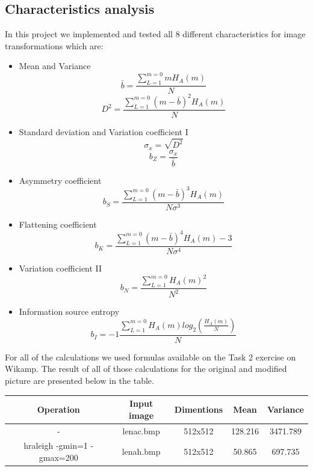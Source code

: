 \documentclass[12pt]{article}
\begin{document}
\subsection{Characteristics analysis}

In this project we implemented and tested all 8 different characteristics for image transformations which are:
\begin{itemize}
  \item Mean and Variance
  \[\bar{b} = \frac{\sum_{L=1}^{m=0}mH_A(m)}{N}\]
   \[  D^2 = \frac{\sum_{L=1}^{m=0}(m-\bar{b})^2H_A(m)}{N}\]
  \item Standard deviation and Variation coefficient I
   \[ \sigma _x=\sqrt{D^{2}}\]
    \[ b_Z= \frac{\sigma _x}{\bar{b}}\]
  \item Asymmetry coefficient
   \[b_S = \frac{\sum_{L=1}^{m=0}(m-\bar{b})^3H_A(m)}{N\sigma^3 }\]
  \item Flattening coefficient
   \[ b_K = \frac{\sum_{L=1}^{m=0}(m-\bar{b})^4H_A(m)-3}{N\sigma^4 }\]
  \item Variation coefficient II
   \[ b_N = \frac{\sum_{L=1}^{m=0}H_A(m)^2}{N^2}\]
  \item Information source entropy
   \[ b_I = -1\frac{\sum_{L=1}^{m=0}H_A(m)log_2(\frac{H_A(m)}{N})}{N}\]
\end{itemize}

For all of the calculations we used formulas available on the Task 2 exercise on Wikamp. The result of all of those calculations for the original and modified picture are presented below in the table.

\begin{table}[H]\centering
    \begin{tabular}{ccccc}

        Operation 	
        & Input image 
        & Dimentions 
        &Mean 
        &Variance 
        \\\midrule
        -                         
        & lenac.bmp     
        & 512x512      
        &		128.216
        &3471.789
        \\
       hraleigh -gmin=1 -gmax=200         
       & lenah.bmp      
       & 512x512    
       &	50.865	
       &697.735
       \\

    \end{tabular}
\end{table}
\end{document}
